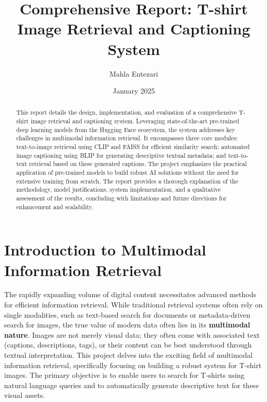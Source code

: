 \documentclass{article}
\begin{document}
\title{\textbf{Comprehensive Report: T-shirt Image Retrieval and Captioning System}}
\author{Mahla Entezari}
\date{January 2025}


\maketitle



\begin{abstract}
This report details the design, implementation, and evaluation of a comprehensive T-shirt image retrieval and captioning system. Leveraging state-of-the-art pre-trained deep learning models from the Hugging Face ecosystem, the system addresses key challenges in multimodal information retrieval. It encompasses three core modules: text-to-image retrieval using CLIP and FAISS for efficient similarity search; automated image captioning using BLIP for generating descriptive textual metadata; and text-to-text retrieval based on these generated captions. The project emphasizes the practical application of pre-trained models to build robust AI solutions without the need for extensive training from scratch. The report provides a thorough explanation of the methodology, model justifications, system implementation, and a qualitative assessment of the results, concluding with limitations and future directions for enhancement and scalability.
\end{abstract}

\newpage
\tableofcontents
\newpage




\section{Introduction to Multimodal Information Retrieval}
\label{sec:introduction}



The rapidly expanding volume of digital content necessitates advanced methods for efficient information retrieval. While traditional retrieval systems often rely on single modalities, such as text-based search for documents or metadata-driven search for images, the true value of modern data often lies in its \textbf{multimodal nature}. Images are not merely visual data; they often come with associated text (captions, descriptions, tags), or their content can be best understood through textual interpretation. This project delves into the exciting field of multimodal information retrieval, specifically focusing on building a robust system for T-shirt images. The primary objective is to enable users to search for T-shirts using natural language queries and to automatically generate descriptive text for these visual assets.
\end{document}
